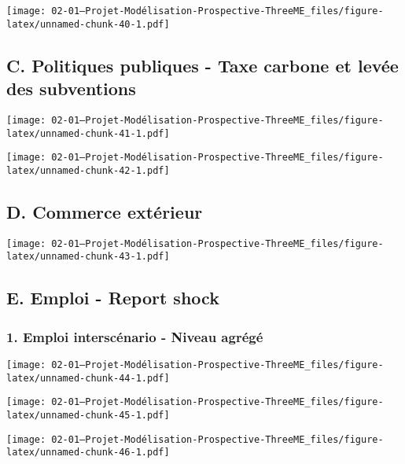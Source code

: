 \documentclass[
]{article}
\begin{document}
\texttt{[image: 02-01---Projet-Modélisation-Prospective-ThreeME\_files/figure-latex/unnamed-chunk-40-1.pdf]}

\hypertarget{c.-politiques-publiques---taxe-carbone-et-levuxe9e-des-subventions}{%
\subsection{C. Politiques publiques - Taxe carbone et levée des
subventions}\label{c.-politiques-publiques---taxe-carbone-et-levuxe9e-des-subventions}}

\texttt{[image: 02-01---Projet-Modélisation-Prospective-ThreeME\_files/figure-latex/unnamed-chunk-41-1.pdf]}

\texttt{[image: 02-01---Projet-Modélisation-Prospective-ThreeME\_files/figure-latex/unnamed-chunk-42-1.pdf]}

\hypertarget{d.-commerce-extuxe9rieur}{%
\subsection{D. Commerce extérieur}\label{d.-commerce-extuxe9rieur}}

\texttt{[image: 02-01---Projet-Modélisation-Prospective-ThreeME\_files/figure-latex/unnamed-chunk-43-1.pdf]}

\hypertarget{e.-emploi---report-shock}{%
\subsection{E. Emploi - Report shock}\label{e.-emploi---report-shock}}

\hypertarget{emploi-interscuxe9nario---niveau-agruxe9guxe9}{%
\subsubsection{1. Emploi interscénario - Niveau
agrégé}\label{emploi-interscuxe9nario---niveau-agruxe9guxe9}}

\texttt{[image: 02-01---Projet-Modélisation-Prospective-ThreeME\_files/figure-latex/unnamed-chunk-44-1.pdf]}

\texttt{[image: 02-01---Projet-Modélisation-Prospective-ThreeME\_files/figure-latex/unnamed-chunk-45-1.pdf]}

\texttt{[image: 02-01---Projet-Modélisation-Prospective-ThreeME\_files/figure-latex/unnamed-chunk-46-1.pdf]}
\end{document}
